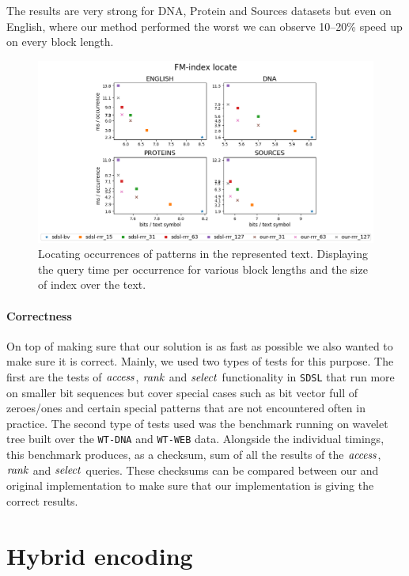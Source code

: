 The results are very strong for DNA, Protein and Sources datasets but even on English, where
our method performed the worst we can observe 10--20\% speed up on every block length.

\begin{figure}
	\centerline{
		\includegraphics[width=\textwidth, height=0.4\textheight]{images/vysledky_sdsl_locate}
	}
	\caption[TODO]{Locating occurrences of patterns in the represented text. Displaying
	the query time per occurrence for various block lengths and the size of index over the
	text.
	}
	\label{obr:benchmark_sdsl_locate}
\end{figure}

\paragraph{Correctness}

On top of making sure that our solution is as fast as possible we also wanted to make sure it is
correct. Mainly, we used two types of tests for this purpose. The first are the tests of $\mathit{access}$,
$\mathit{rank}$ and $\mathit{select}$ functionality in \texttt{SDSL} that run more on smaller bit sequences
but cover special cases such as bit vector full of zeroes/ones and certain special patterns
that are not encountered often in practice. The second type of tests used was the benchmark
running on wavelet tree built over the \texttt{WT-DNA} and \texttt{WT-WEB} data. Alongside
the individual timings, this benchmark produces, as a checksum, sum of all the results of the
$\mathit{access}$, $\mathit{rank}$ and $\mathit{select}$ queries. These checksums can be compared between our and original
implementation to make sure that our implementation is giving the correct results.

\section{Hybrid encoding}

